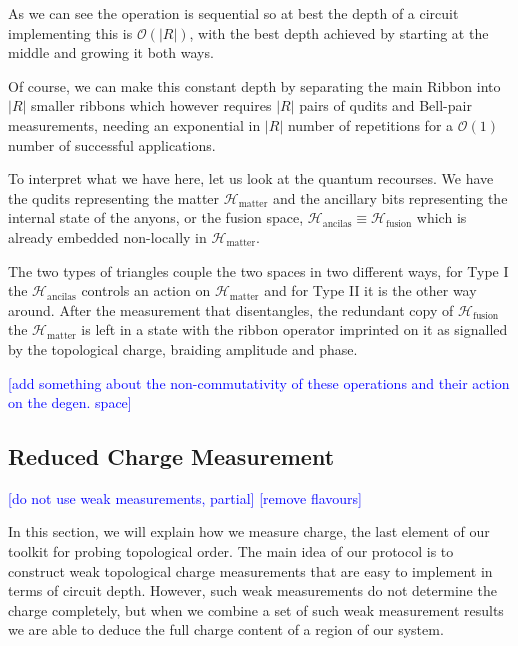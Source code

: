 \documentclass[two column]{article}
\newcommand{\caro}[1]{\textcolor{red}{[#1]}}
\newcommand{\jovan}[1]{\textcolor{blue}{[#1]}}
\begin{document}
As we can see the operation is sequential so at best the depth of a circuit implementing this is $\mathcal{O}(|R|)$, with the best depth achieved by starting at the middle and growing it both ways.

Of course, we can make this constant depth by separating the main Ribbon into $|R|$ smaller ribbons which however requires $|R|$ pairs of qudits and Bell-pair measurements, needing an exponential  in $|R|$ number of repetitions for a $\mathcal{O}(1)$ number of successful applications.

To interpret what we have here, let us look at the quantum recourses. We have the qudits representing the matter $\mathcal{H}_{\text{matter}}$ and the ancillary bits representing the internal state of the anyons, or the fusion space, $\mathcal{H}_{\text{ancilas}} \equiv \mathcal{H}_{\text{fusion}}$ which is already embedded non-locally in  $\mathcal{H}_{\text{matter}}$.

The two types of triangles couple the two spaces in two different ways, for Type I the $\mathcal{H}_{\text{ancilas}}$ controls an action on $\mathcal{H}_{\text{matter}}$ and for Type II it is the other way around. After the measurement that disentangles, the redundant copy of $\mathcal{H}_{\text{fusion}}$ the $\mathcal{H}_{\text{matter}}$ is left in a state with the ribbon operator imprinted on it as signalled by the topological charge, braiding amplitude and phase.

\jovan{add something about the non-commutativity of these operations and their action on the degen. space}

\subsection{Reduced Charge Measurement}

\jovan{do not use weak measurements, partial}
\jovan{remove flavours}

In this section, we will explain how we measure charge, the last element of our toolkit for probing topological order. The main idea of our protocol is to construct weak topological charge measurements that are easy to implement in terms of circuit depth. However, such weak measurements do not determine the charge completely, but when we combine a set of such weak measurement results we are able to deduce the full charge content of a region of our system.
\end{document}
